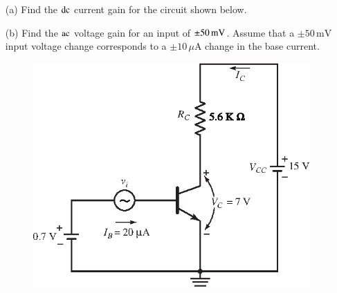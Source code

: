 \eject

\begin{example}\label{exam3.11}
\begin{itemize}
\item[(a)] Find the $\operatorname{dc}$ current gain for the circuit shown below.

\item[(b)] Find the $\operatorname{ac}$ voltage gain for an input of $\pm 50\text{\,mV}$. Assume that a $\pm 50\,\text{mV}$ input voltage change corresponds to a $\pm 10\,\mu\text{A}$ change in the base current.
\begin{figure}[H]
\centering
\includegraphics{chap2/S3-EE-03-015.eps}
\end{figure}
\end{itemize}
\end{example}

